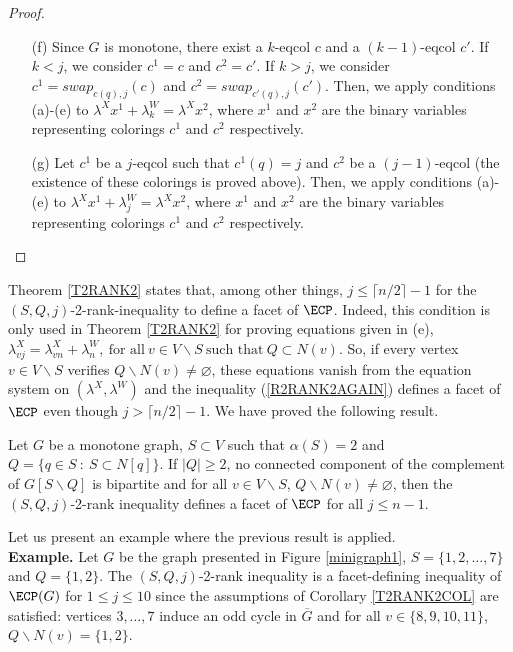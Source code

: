 \begin{proof}
\begin{enumerate}
\item[(f)] Since $G$ is monotone, there exist a $k$-eqcol $c$ and a $(k-1)$-eqcol $c'$.
If $k < j$, we consider $c^1 = c$ and $c^2 = c'$. If $k > j$, we consider
$c^1 = swap_{c(q),j}(c)$ and $c^2 = swap_{c'(q),j}(c')$. Then, we apply conditions (a)-(e)
to $\lambda^X x^1 + \lambda^W_k = \lambda^X x^2$, where $x^1$ and $x^2$ are the binary variables representing
colorings $c^1$ and $c^2$ respectively.
\item[(g)] Let $c^1$ be a $j$-eqcol such that $c^1(q) = j$ and $c^2$ be a $(j-1)$-eqcol (the existence of these
colorings is proved above). Then, we apply conditions (a)-(e) to $\lambda^X x^1 + \lambda^W_j = \lambda^X x^2$,
where $x^1$ and $x^2$ are the binary variables representing colorings $c^1$ and $c^2$ respectively.
\end{enumerate}
\end{proof}

Theorem \ref{T2RANK2} states that, among other things, $j \leq \lceil n/2 \rceil - 1$ for the
$(S,Q,j)$-2-rank-inequality to define a facet of $\ECP$. Indeed,
this condition is only used in Theorem \ref{T2RANK2} for proving equations given in (e),
\ie $\lambda^X_{vj} = \lambda^X_{vn} + \lambda^W_n,~ \textrm{for all}~ v \in V \backslash S ~\textrm{such that}~ Q \subset N(v)$. So, if every vertex $v \in V \backslash S$ verifies
$Q \backslash N(v) \neq \varnothing$, these equations
vanish from the equation system on $(\lambda^X, \lambda^W)$ and the inequality (\ref{R2RANK2AGAIN}) defines a facet of $\ECP$ even though $j > \lceil n/2 \rceil - 1$. We have proved the following result.

\begin{tcor} \label{T2RANK2COL}
Let $G$ be a monotone graph, $S \subset V$ such that $\alpha(S) = 2$ and $Q = \{ q \in S ~:~ S \subset N[q] \}$.
If $|Q| \geq 2$, no connected component of the complement of $G[S \backslash Q]$
is bipartite and for all $v \in V \backslash S$, $Q \backslash N(v) \neq \varnothing$, then the $(S,Q,j)$-2-rank
inequality defines a facet of $\ECP$ for all $j \leq n-1$.
\end{tcor}

Let us present an example where the previous result is applied.\\

\noindent \textbf{Example.} Let $G$ be the graph presented in Figure \ref{minigraph1}, $S = \{1,2,\ldots,7\}$ and $Q = \{1,2\}$.
The $(S,Q,j)$-2-rank inequality is a facet-defining inequality of $\ECP(G)$ for $1 \leq j \leq 10$ since the
assumptions of Corollary \ref{T2RANK2COL} are satisfied: vertices $3,\ldots,7$ induce an odd cycle in
$\overline{G}$ and for all $v \in \{8,9,10,11\}$, $Q \backslash N(v) = \{1,2\}$.

